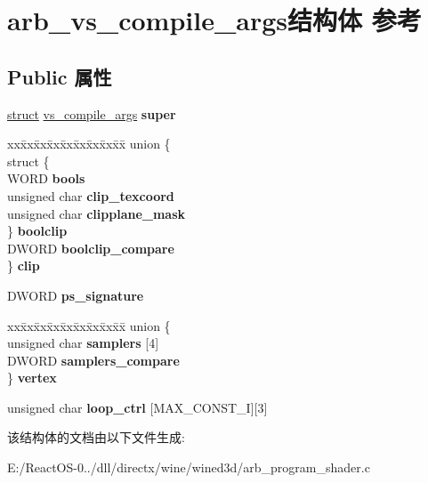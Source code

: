 \hypertarget{structarb__vs__compile__args}{}\section{arb\+\_\+vs\+\_\+compile\+\_\+args结构体 参考}
\label{structarb__vs__compile__args}
\subsection*{Public 属性}
\begin{DoxyCompactItemize}
\item 
\mbox{\label{structarb__vs__compile__args_aa388d9da14ab007aa5097e9260742431}} 
\hyperlink{interfacestruct}{struct} \hyperlink{structvs__compile__args}{vs\+\_\+compile\+\_\+args} {\bfseries super}
\item 
\mbox{\label{structarb__vs__compile__args_a5f31b091a904b34aab5281e1e2cf88e5}} 
\begin{tabbing}
xx\=xx\=xx\=xx\=xx\=xx\=xx\=xx\=xx\=\kill
union \{\\
\>struct \{\\
\>\>WORD {\bfseries bools}\\
\>\>unsigned char {\bfseries clip\_texcoord}\\
\>\>unsigned char {\bfseries clipplane\_mask}\\
\>\} {\bfseries boolclip}\\
\>DWORD {\bfseries boolclip\_compare}\\
\} {\bfseries clip}\\

\end{tabbing}\item 
\mbox{\label{structarb__vs__compile__args_ae06509830496a49c631cd4ebf76126c4}} 
D\+W\+O\+RD {\bfseries ps\+\_\+signature}
\item 
\mbox{\label{structarb__vs__compile__args_ae63a995374cb8314a977190cfea569b0}} 
\begin{tabbing}
xx\=xx\=xx\=xx\=xx\=xx\=xx\=xx\=xx\=\kill
union \{\\
\>unsigned char {\bfseries samplers} \mbox{[}4\mbox{]}\\
\>DWORD {\bfseries samplers\_compare}\\
\} {\bfseries vertex}\\

\end{tabbing}\item 
\mbox{\label{structarb__vs__compile__args_aaa559b7f84b05bb751ec12818e0215bf}} 
unsigned char {\bfseries loop\+\_\+ctrl} \mbox{[}M\+A\+X\+\_\+\+C\+O\+N\+S\+T\+\_\+I\mbox{]}\mbox{[}3\mbox{]}
\end{DoxyCompactItemize}


该结构体的文档由以下文件生成\+:\begin{DoxyCompactItemize}
\item 
E\+:/\+React\+O\+S-\/0../dll/directx/wine/wined3d/arb\+\_\+program\+\_\+shader.\+c\end{DoxyCompactItemize}
